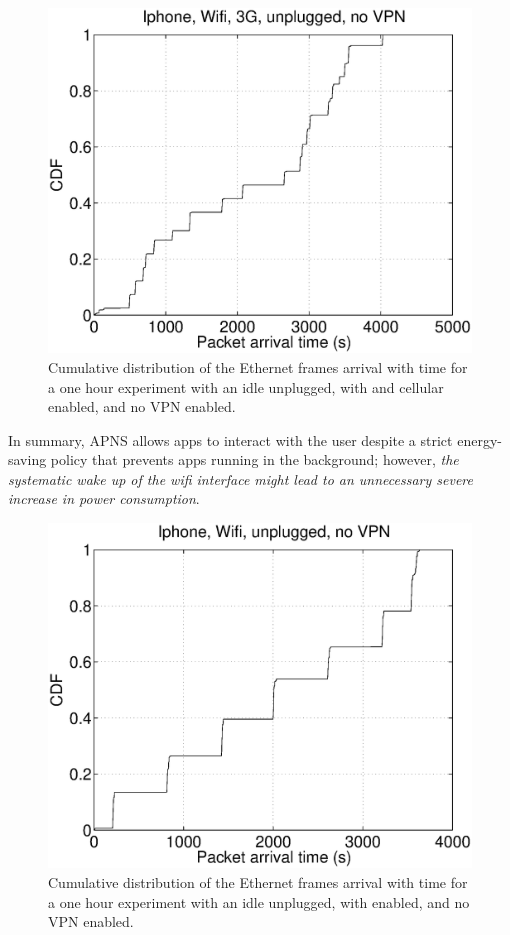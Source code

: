 \begin{figure}
\centering
        \includegraphics[width=0.8\linewidth]{../../code/pushNotification/Fig/bw_iphone_wifi_3g_unplug_novpn_ts.eps}
  \caption{Cumulative distribution of the Ethernet frames
          arrival with time for a one hour experiment with an idle
          \iphone{} unplugged, with \wifi{} and cellular enabled, and no VPN
          enabled.}
  \label{fig:push_w3_ts}
   \vspace{\postfigspace}
\end{figure}


In summary, APNS allows apps to interact with the user despite a strict energy-saving policy that 
prevents apps running in the background; however, \emph{the systematic wake up of
the wifi interface might lead to an unnecessary severe increase in power
consumption}. 


\begin{figure}
\centering
        \includegraphics[width=0.8\linewidth]{../../code/pushNotification/Fig/bw_iphone_wifi_unplug_novpn_ts.eps}
  \caption{Cumulative distribution of the Ethernet frames
          arrival with time for a one hour experiment with an idle
          \iphone{} unplugged, with \wifi{} enabled, and no VPN
          enabled.}
  \label{fig:push_w_ts}
   \vspace{\postfigspace}
\end{figure}

